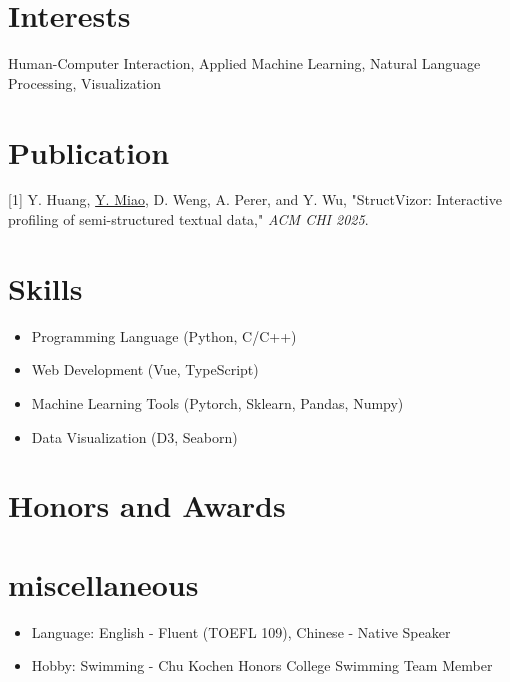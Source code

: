 \documentclass{resume}
\begin{document}
\section{Interests}
Human-Computer Interaction, Applied Machine Learning, Natural Language Processing, Visualization

\section{Publication}
{[1] Y. Huang, \uline{Y. Miao}, D. Weng, A. Perer, and Y. Wu, "StructVizor: Interactive profiling of
semi-structured textual data," \textit{ACM CHI 2025}.}


\section{Skills}
\begin{itemize}[parsep=0.5ex]
    \item Programming Language (Python, C/C++)
    \item Web Development (Vue, TypeScript)
    \item Machine Learning Tools (Pytorch, Sklearn, Pandas, Numpy)
    \item Data Visualization (D3, Seaborn)
\end{itemize}

\section{Honors and Awards}

\section{miscellaneous}
\begin{itemize}[parsep=0.5ex]
  \item Language: English - Fluent (TOEFL 109), Chinese - Native Speaker
  \item Hobby: Swimming - Chu Kochen Honors College Swimming Team Member
\end{itemize}

%
%
\end{document}
